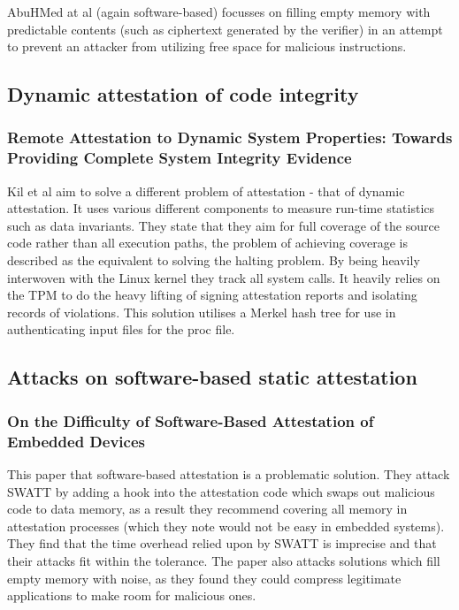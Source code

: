 AbuHMed at al \cite{AbuHmed2009} (again software-based) focusses on filling empty memory with predictable contents (such as ciphertext generated by the verifier) in an attempt to prevent an attacker from utilizing free space for malicious instructions.

\subsection{Dynamic attestation of code integrity} \label{dynamicAttestationSolutions}

\subsubsection{Remote Attestation to Dynamic System Properties: Towards Providing Complete System Integrity Evidence}

Kil et al \cite{Kil2009} aim to solve a different problem of attestation - that of dynamic attestation. It uses various different components to measure run-time statistics such as data invariants. They state that they aim for full coverage of the source code rather than all execution paths, the problem of achieving coverage is described as the equivalent to solving the halting problem. By being heavily interwoven with the Linux kernel they track all system calls. It heavily relies on the TPM to do the heavy lifting of signing attestation reports and isolating records of violations. This solution utilises a Merkel hash tree for use in authenticating input files for the proc file.

\subsection{Attacks on software-based static attestation} \label{attestationSolutionsAttacks}

\subsubsection{On the Difficulty of Software-Based Attestation of Embedded Devices}

This paper \cite{Castelluccia2009} that software-based attestation is a problematic solution. They attack SWATT \cite{Seshadri2004} by adding a hook into the attestation code which swaps out malicious code to data memory, as a result they recommend covering all memory in attestation processes (which they note would not be easy in embedded systems). They find that the time overhead relied upon by SWATT \cite{Seshadri2004} is imprecise and that their attacks fit within the tolerance. The paper also attacks solutions which fill empty memory with noise, as they found they could compress legitimate applications to make room for malicious ones.

